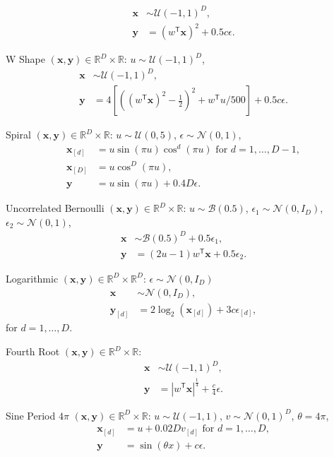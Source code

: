 \documentclass[11pt]{article}
\providecommand{\mb}[1]{\boldsymbol{#1}}
\providecommand{\mc}[1]{\mathcal{#1}}
\newcommand{\Real}{\mathbb{R}}
\newcommand{\T}{^{\ensuremath{\mathsf{T}}}}           %
\begin{document}
\begin{compactenum}
\begin{align*}
\mb{x} &\sim \mc{U}(-1,1)^{D},\\
\mb{y}&=(w\T \mb{x})^2+0.5c\epsilon.
\end{align*}
\item W Shape $(\mb{x},\mb{y}) \in \Real^{D} \times \Real$:  $u \sim \mc{U}(-1,1)^{D}$,
\begin{align*}
\mb{x} &\sim \mc{U}(-1,1)^{D},\\
\mb{y}&=4\left[ \left( (w\T \mb{x})^2 - \tfrac{1}{2} \right)^2 + w\T u/500 \right]+0.5c\epsilon.
\end{align*}
\item Spiral $(\mb{x},\mb{y}) \in \Real^{D} \times \Real$: $u \sim \mc{U}(0,5)$, $\epsilon \sim \mc{N}(0, 1)$,
\begin{align*}
\mb{x}_{[d]}&=u \sin(\pi u)  \cos^{d}(\pi u) \mbox{ for $d=1,\ldots,D-1$},\\
\mb{x}_{[D]}&=u \cos^{D}(\pi u),\\
\mb{y}&= u \sin(\pi u) +0.4 D\epsilon.
\end{align*}
\item Uncorrelated Bernoulli $(\mb{x},\mb{y}) \in \Real^{D} \times \Real$: $u \sim \mc{B}(0.5)$, $\epsilon_{1} \sim \mc{N}(0, I_{D})$, $\epsilon_{2} \sim \mc{N}(0, 1)$,
\begin{align*}
\mb{x} &\sim \mc{B}(0.5)^{D}+0.5\epsilon_{1},\\
\mb{y}&=(2u-1)w\T \mb{x}+0.5\epsilon_{2}.
\end{align*}
\item Logarithmic $(\mb{x},\mb{y}) \in \Real^{D} \times \Real^{D}$: $\epsilon \sim \mc{N}(0, I_{D})$
\begin{align*}
\mb{x} &\sim \mc{N}(0, I_{D}),\\
\mb{y}_{[d]}&=2\log_{2}(\mb{x}_{[d]})+3c\epsilon_{[d]},
\end{align*}
for $d=1,\ldots,D$.
\item Fourth Root $(\mb{x},\mb{y}) \in \Real^{D} \times \Real$:
\begin{align*}
\mb{x} &\sim \mc{U}(-1,1)^{D},\\
\mb{y}&=|w\T \mb{x}|^\frac{1}{4}+\frac{c}{4}\epsilon.
\end{align*}
\item Sine Period $4\pi$ $(\mb{x},\mb{y}) \in \Real^{D} \times \Real$: $u \sim \mc{U}(-1,1)$, $v \sim \mc{N}(0,1)^{D}$, $\theta=4\pi$,
\begin{align*}
\mb{x}_{[d]}&=u+0.02 D v_{[d]} \mbox{ for $d=1,\ldots,D$}, \\
\mb{y}&=\sin ( \theta x )+c\epsilon.

\end{align*}
\end{compactenum}
\end{document}
